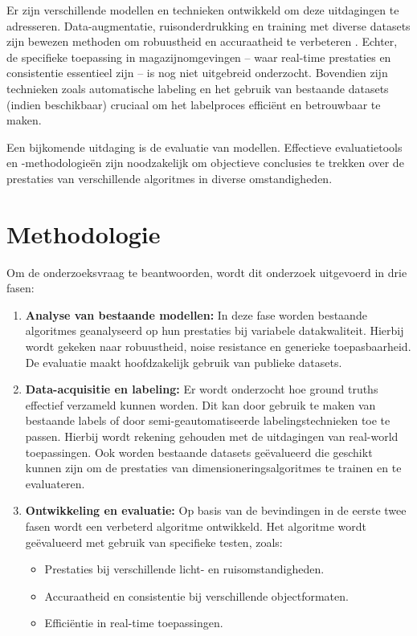 Er zijn verschillende modellen en technieken ontwikkeld om deze uitdagingen te adresseren. Data-augmentatie, ruisonderdrukking en training met diverse datasets zijn bewezen methoden om robuustheid en accuraatheid te verbeteren \autocite{AdaptLearn2024}. Echter, de specifieke toepassing in magazijnomgevingen – waar real-time prestaties en consistentie essentieel zijn – is nog niet uitgebreid onderzocht. Bovendien zijn technieken zoals automatische labeling en het gebruik van bestaande datasets (indien beschikbaar) cruciaal om het labelproces efficiënt en betrouwbaar te maken.

Een bijkomende uitdaging is de evaluatie van modellen. Effectieve evaluatietools en -methodologieën zijn noodzakelijk om objectieve conclusies te trekken over de prestaties van verschillende algoritmes in diverse omstandigheden.


\section{Methodologie}
\label{sec:methodologie}

Om de onderzoeksvraag te beantwoorden, wordt dit onderzoek uitgevoerd in drie fasen:
\begin{enumerate}
    \item \textbf{Analyse van bestaande modellen:} In deze fase worden bestaande algoritmes geanalyseerd op hun prestaties bij variabele datakwaliteit. Hierbij wordt gekeken naar robuustheid, noise resistance en generieke toepasbaarheid. De evaluatie maakt hoofdzakelijk gebruik van publieke datasets.
    
    \item \textbf{Data-acquisitie en labeling:} Er wordt onderzocht hoe ground truths effectief verzameld kunnen worden. Dit kan door gebruik te maken van bestaande labels of door semi-geautomatiseerde labelingstechnieken toe te passen. Hierbij wordt rekening gehouden met de uitdagingen van real-world toepassingen. Ook worden bestaande datasets geëvalueerd die geschikt kunnen zijn om de prestaties van dimensioneringsalgoritmes te trainen en te evaluateren.

    \item \textbf{Ontwikkeling en evaluatie:} Op basis van de bevindingen in de eerste twee fasen wordt een verbeterd algoritme ontwikkeld. Het algoritme wordt geëvalueerd met gebruik van specifieke testen, zoals:
    \begin{itemize}
        \item Prestaties bij verschillende licht- en ruisomstandigheden.
        \item Accuraatheid en consistentie bij verschillende objectformaten.
        \item Efficiëntie in real-time toepassingen.
    \end{itemize}
\end{enumerate}

